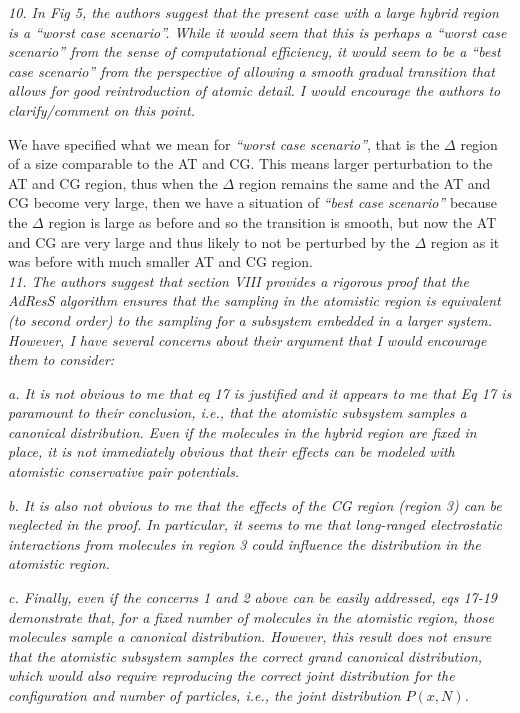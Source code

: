 \documentclass[a4paper]{article}
\begin{document}
\textit{
10.  In Fig 5, the authors suggest that the present case with a large
hybrid region is a {\it ``worst case scenario''}. While it would seem that
this is perhaps a {\it ``worst case scenario''} from the sense of
computational efficiency, it would seem to be a ``best case scenario''
from the perspective of allowing a smooth gradual transition that
allows for good reintroduction of atomic detail. I would encourage the
authors to clarify/comment on this point.
}

We have specified what we mean for {\it ``worst case scenario''}, that is the $\Delta$ region of a size comparable to the AT and CG. This means larger perturbation to the AT and CG region, thus when the $\Delta$ region remains the same and the AT and CG become very large, then we have a situation of {\it ``best case scenario''} because the $\Delta$ region is large as before and so the transition is smooth, but now the AT and CG are very large and thus likely to not be perturbed by the $\Delta$ region as it was before with much smaller AT and CG region.
\\

\textit{
11. The authors suggest that section VIII provides a rigorous proof
that the AdResS algorithm ensures that the sampling in the atomistic
region is equivalent (to second order) to the sampling for a subsystem
embedded in a larger system. However, I have several concerns about
their argument that I would encourage them to consider:
}

\textit{
a. It is not obvious to me that eq 17 is justified and it appears to
me that Eq 17 is paramount to their conclusion, i.e., that the
atomistic subsystem samples a canonical distribution. Even if the
molecules in the hybrid region are fixed in place, it is not
immediately obvious that their effects can be modeled with atomistic
conservative pair potentials.
}

\textit{
b. It is also not obvious to me that the effects of the CG region
(region 3) can be neglected in the proof. In particular, it seems to
me that long-ranged electrostatic interactions from molecules in
region 3 could influence the distribution in the atomistic region.
}

\textit{
  c.	Finally, even if the concerns 1 and 2 above can be easily addressed, eqs 17-19 demonstrate that, for a fixed number of molecules in the atomistic region, those molecules sample a canonical distribution. However, this result does not ensure that the atomistic subsystem samples the correct grand canonical distribution, which would also require reproducing the correct joint distribution for the configuration and number of particles, i.e., the joint distribution $P(x,N)$. }
\end{document}
